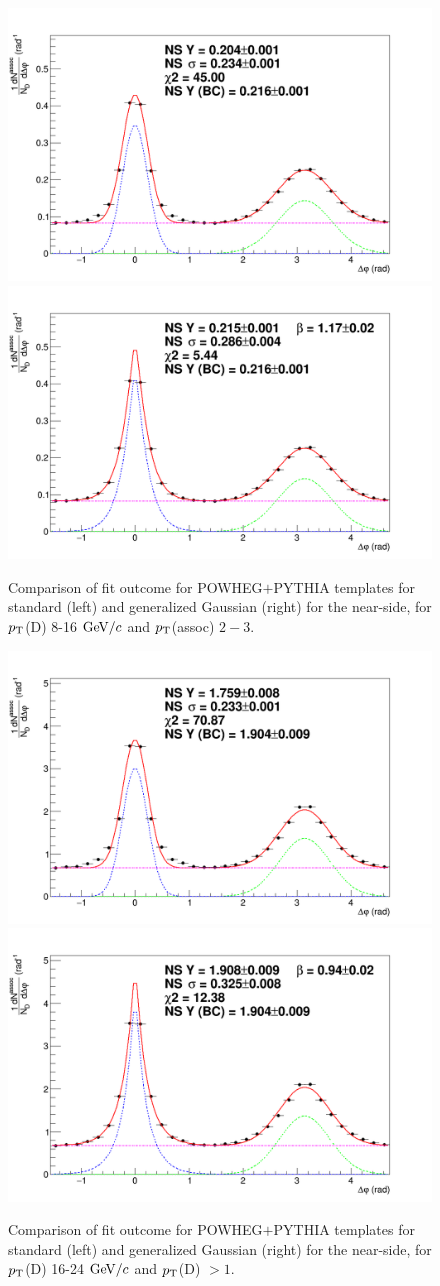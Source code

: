 \begin{figure}[h]
\centering
\includegraphics[width=0.48\linewidth]{figures/Fits/FitOfTemplate_CorrelationPlotsPOWHEG_8To16_2to3_Func2.png}
\includegraphics[width=0.48\linewidth]{figures/Fits/FitOfTemplate_CorrelationPlotsPOWHEG_8To16_2to3_Func7.png}
\caption{Comparison of fit outcome for POWHEG$+$PYTHIA templates for standard (left) and generalized Gaussian (right) for the near-side, for $p_{\rm T}$(D) 8-16 $\mathrm{GeV}/c$ and $p_{\rm T}$(assoc) $2-3$.}
\label{fig:TemplateFits3}
\end{figure}
\begin{figure}[h]
\centering
\includegraphics[width=0.48\linewidth]{figures/Fits/FitOfTemplate_CorrelationPlotsPOWHEG_16To24_1to99_Func2.png}
\includegraphics[width=0.48\linewidth]{figures/Fits/FitOfTemplate_CorrelationPlotsPOWHEG_16To24_1to99_Func7.png}
\caption{Comparison of fit outcome for POWHEG$+$PYTHIA templates for standard (left) and generalized Gaussian (right) for the near-side, for $p_{\rm T}$(D) 16-24 $\mathrm{GeV}/c$ and $p_{\rm T}$(D) $>1$.}
\label{fig:TemplateFits4}
\end{figure}

